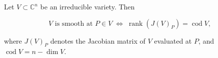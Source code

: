 Let $V \subset \mathbb{C}^n$ be an irreducible variety. Then

$$V \text{ is smooth at } P \in V \;\Leftrightarrow\; \operatorname{rank}(J(V)_P) = \operatorname{cod} V,$$

where $J(V)_P$ denotes the Jacobian matrix of $V$ evaluated at $P$, and $\operatorname{cod} V = n - \dim V$.
